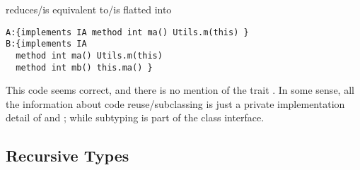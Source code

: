 \noindent reduces/is equivalent to/is flatted into
  
 \begin{lstlisting}
A:{implements IA method int ma() Utils.m(this) }
B:{implements IA
  method int ma() Utils.m(this)
  method int mb() this.ma() } 

 \end{lstlisting}
 
This code seems correct, and there is no mention of the trait \Q@ta@. In some sense, all the information about code reuse/subclassing is just a private implementation detail of \Q@A@ and \Q@B@; while subtyping is part of the class interface. 

\subsection{Recursive Types}

